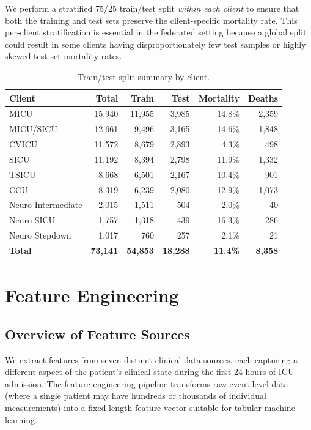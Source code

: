 \documentclass[11pt,a4paper]{report}
\begin{document}
We perform a stratified 75/25 train/test split \emph{within each client} to ensure that both the training and test sets preserve the client-specific mortality rate. This per-client stratification is essential in the federated setting because a global split could result in some clients having disproportionately few test samples or highly skewed test-set mortality rates.

\begin{table}[H]
\centering
\caption{Train/test split summary by client.}
\label{tab:split}
\begin{tabular}{lrrrrr}
\toprule
\textbf{Client} & \textbf{Total} & \textbf{Train} & \textbf{Test} & \textbf{Mortality} & \textbf{Deaths} \\
\midrule
MICU & 15,940 & 11,955 & 3,985 & 14.8\% & 2,359 \\
MICU/SICU & 12,661 & 9,496 & 3,165 & 14.6\% & 1,848 \\
CVICU & 11,572 & 8,679 & 2,893 & 4.3\% & 498 \\
SICU & 11,192 & 8,394 & 2,798 & 11.9\% & 1,332 \\
TSICU & 8,668 & 6,501 & 2,167 & 10.4\% & 901 \\
CCU & 8,319 & 6,239 & 2,080 & 12.9\% & 1,073 \\
Neuro Intermediate & 2,015 & 1,511 & 504 & 2.0\% & 40 \\
Neuro SICU & 1,757 & 1,318 & 439 & 16.3\% & 286 \\
Neuro Stepdown & 1,017 & 760 & 257 & 2.1\% & 21 \\
\midrule
\textbf{Total} & \textbf{73,141} & \textbf{54,853} & \textbf{18,288} & \textbf{11.4\%} & \textbf{8,358} \\
\bottomrule
\end{tabular}
\end{table}


\chapter{Feature Engineering}

\section{Overview of Feature Sources}

We extract features from seven distinct clinical data sources, each capturing a different aspect of the patient's clinical state during the first 24 hours of ICU admission. The feature engineering pipeline transforms raw event-level data (where a single patient may have hundreds or thousands of individual measurements) into a fixed-length feature vector suitable for tabular machine learning.
\end{document}
